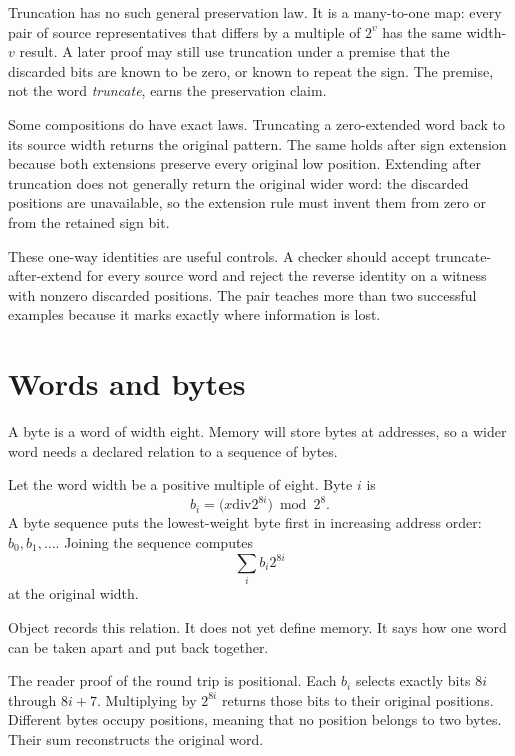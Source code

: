 Truncation has no such general preservation law. It is a many-to-one map:
every pair of source representatives that differs by a multiple of \(2^v\)
has the same width-\(v\) result. A later proof may still use truncation under a
premise that the discarded bits are known to be zero, or known to repeat the
sign. The premise, not the word \emph{truncate}, earns the preservation claim.

Some compositions do have exact laws. Truncating a zero-extended word back to
its source width returns the original pattern. The same holds after sign
extension because both extensions preserve every original low position.
Extending after truncation does not generally return the original wider word:
the discarded positions are unavailable, so the extension rule must invent
them from zero or from the retained sign bit.

These one-way identities are useful controls. A checker should accept
truncate-after-extend for every source word and reject the reverse identity on
a witness with nonzero discarded positions. The pair teaches more than two
successful examples because it marks exactly where information is lost.

\section{Words and bytes}

A byte is a word of width eight. Memory will store bytes at addresses, so a
wider word needs a declared relation to a sequence of bytes.

\begin{definition}[title={Little-endian split and join}]
Let the word width be a positive multiple of eight. Byte \(i\) is
\[
  b_i =
  \bigl(x \mathbin{\mathrm{div}} 2^{8i}\bigr) \bmod 2^8.
\]
A  byte sequence puts the lowest-weight byte first in
increasing address order: \(b_0,b_1,\ldots\). Joining the sequence computes
\[
  \sum_i b_i 2^{8i}
\]
at the original width.
\end{definition}

Object  records this relation. It does not yet define memory.
It says how one word can be taken apart and put back together.

The reader proof of the round trip is positional. Each \(b_i\) selects exactly
bits \(8i\) through \(8i+7\). Multiplying by \(2^{8i}\) returns those bits to
their original positions. Different bytes occupy  positions,
meaning that no position belongs to two bytes. Their sum reconstructs the
original word.

